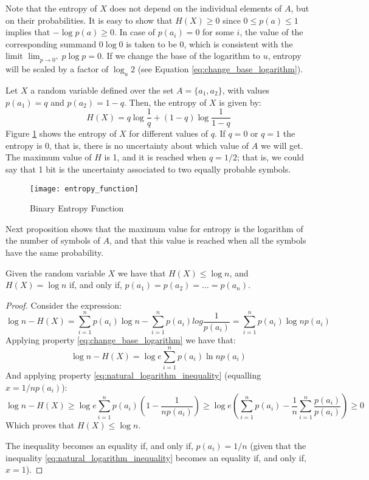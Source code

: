 Note that the entropy of $X$ does not depend on the individual elements of $A$, but on their probabilities. It is easy to show that $H(X) \geq 0$ since $0 \leq p(a) \leq 1$ implies that $-\log p(a) \geq 0$. In case of $p(a_i) = 0$ for some $i$, the value of the corresponding summand $0 \log 0$ is taken to be $0$, which is consistent with the limit $\lim_{p\to 0^+} p \log p = 0$. If we change the base of the logarithm to $u$, entropy will be scaled by a factor of $\log_u 2$ (see Equation \ref{eq:change_base_logarithm}).

\begin{example}
Let $X$ a random variable defined over the set $A = \{a_1, a_2\}$, with values $p(a_1) = q$ and $p(a_2) = 1-q$. Then, the entropy of $X$ is given by:
\[
H(X) = q \log \frac{1}{q} + (1-q) \log \frac{1}{1-q}
\]
Figure \ref{fig:entropy_function} shows the entropy of $X$ for different values of $q$. If $q=0$ or $q=1$ the entropy is 0, that is, there is no uncertainty about which value of $A$ we will get. The maximum value of $H$ is 1, and it is reached when $q=1/2$; that is, we could say that 1 bit is the uncertainty associated to two equally probable symbols.
\end{example}

\begin{figure}[h]
\centering\texttt{[image: entropy\_function]}
\caption{\label{fig:entropy_function}Binary Entropy Function}
\end{figure}

Next proposition shows that the maximum value for entropy is the logarithm of the number of symbols of $A$, and that this value is reached when all the symbols have the same probability.

\begin{proposition}
\label{prop:maximum_entropy}
Given the random variable $X$ we have that $H(X) \leq \log n$, and $H(X) = \log n$ if, and only if, $p(a_1) = p(a_2) = \ldots = p(a_n)$.
\end{proposition}
\begin{proof}
Consider the expression:
\[
\log n - H(X) = \sum_{i=1}^n p(a_i) \log n - \sum_{i=1}^n p(a_i) log {\frac{1}{p(a_i)}} = \sum_{i=1}^n p(a_i) \log n p(a_i)
\]
Applying property \ref{eq:change_base_logarithm} we have that:
\[
\log n - H(X) = \log e \sum_{i=1}^n p(a_i) \ln n p(a_i)
\]
And applying property \ref{eq:natural_logarithm_inequality} (equalling $x = 1 / n p(a_i)$):
\[
\log n - H(X) \geq \log e \sum_{i=1}^n p(a_i) \left( 1 - \frac{1}{n p(a_i)} \right) \geq \log e \left( \sum_{i=1}^n p(a_i) - \frac{1}{n} \sum_{i=1}^n \frac{p(a_i)}{p(a_i)} \right) \geq 0
\]
Which proves that $H(X) \leq \log n$.

The inequality becomes an equality if, and only if, $p(a_i) = 1 / n$ (given that the inequality \ref{eq:natural_logarithm_inequality} becomes an equality if, and only if, $x=1$).

\end{proof}

